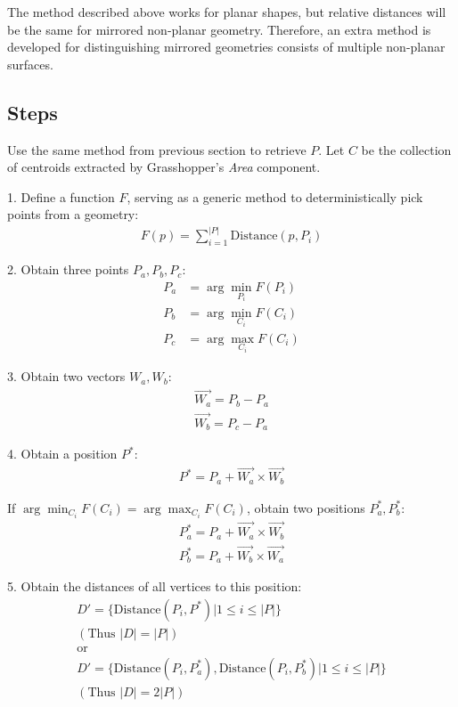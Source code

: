 \documentclass{article}
\begin{document}
The method described above works for planar shapes, but relative distances will be the same for mirrored non-planar geometry. Therefore, an extra method is developed for distinguishing mirrored geometries consists of multiple non-planar surfaces.

\subsection{Steps}

Use the same method from previous section to retrieve $P$. Let $C$ be the collection of centroids extracted by Grasshopper's \textit{Area} component.

1. Define a function $F$, serving as a generic method to deterministically pick points from a geometry:
\begin{align*}
	F(p) = \sum_{i=1}^{|P|}\text{Distance}(p, P_i)
\end{align*}

2. Obtain three points $P_a, P_b, P_c$:
\begin{align*}
	P_a &= \arg \min_{P_i}F(P_i) \\
	P_b &= \arg \min_{C_i}F(C_i) \\
	P_c &= \arg \max_{C_i}F(C_i)
\end{align*}

3. Obtain two vectors $W_a, W_b$:
\begin{align*}
	\vec{W_a} = P_b - P_a \\
	\vec{W_b} = P_c - P_a
\end{align*}

4. Obtain a position $P^*$:
\begin{align*}
	P^* = P_a + \vec{W_a} \times \vec{W_b}
\end{align*}

If $\arg \min_{C_i}F(C_i) = \arg \max_{C_i}F(C_i)$, obtain two positions $P^*_a, P^*_b$:
\begin{align*}
	P^*_a = P_a + \vec{W_a} \times \vec{W_b} \\
	P^*_b = P_a + \vec{W_b} \times \vec{W_a}
\end{align*}

5. Obtain the distances of all vertices to this position:
\begin{gather*}
	D' = \{\text{Distance}(P_i, P^*) | 1 \leq i \leq |P| \} \\
	(\text{Thus } |D| = |P|) \\
	\text{or} \\
	D' = \{\text{Distance}(P_i, P^*_a), \text{Distance}(P_i, P^*_b) | 1 \leq i \leq |P| \} \\
	(\text{Thus } |D| = 2|P|)
\end{gather*}
\end{document}
